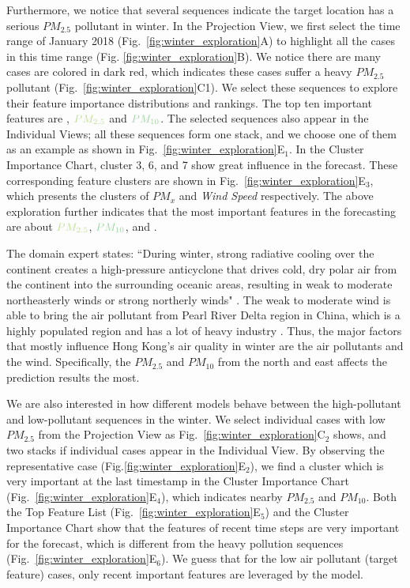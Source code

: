 Furthermore, we notice that several sequences indicate the target location has a serious $PM_{2.5}$ pollutant in winter. 
In the Projection View, we first select the time range of January 2018 (Fig.~\ref{fig:winter_exploration}A) to highlight all the cases in this time range (Fig. \ref{fig:winter_exploration}B). 
We notice there are many cases are colored in dark red, which indicates these cases suffer a heavy $PM_{2.5}$ pollutant (Fig.~\ref{fig:winter_exploration}C1).
We select these sequences to explore their feature importance distributions and rankings.
The top ten important features are \textit{\color{WINDColor}{Wind Speed}}, $\color{PM25Color}{PM_{2.5}}$ and $\color{PM10Color}{PM_{10}}$.
The selected sequences also appear in the Individual Views; all these sequences form one stack, and we choose one of them as an example as shown in Fig.~\ref{fig:winter_exploration}E$_1$. 
In the Cluster Importance Chart, cluster 3, 6, and 7 show great influence in the forecast. 
These corresponding feature clusters are shown in Fig.~\ref{fig:winter_exploration}E$_3$, which presents the clusters of $PM_x$ and \textit{Wind Speed} respectively. 
The above exploration further indicates that the most important features in the forecasting are about $\color{PM25Color}{PM_{2.5}}$, $\color{PM10Color}{PM_{10}}$, and \textit{\color{WINDColor}{Wind Speed}}. 

The domain expert states: ``During winter, strong radiative cooling over the continent creates a high-pressure anticyclone that drives cold, dry polar air from the continent into the surrounding oceanic areas, resulting in weak to moderate northeasterly winds or strong northerly winds" \cite{louie2005seasonal, murakami1979winter}. 
The weak to moderate wind is able to bring the air pollutant from Pearl River Delta region in China, which is a highly populated region and has a lot of heavy industry \cite{cao2003characteristics}.
Thus, the major factors that mostly influence Hong Kong's air quality in winter are the air pollutants and the wind.
Specifically, the $PM_{2.5}$ and $PM_{10}$ from the north and east affects the prediction results the most. 

We are also interested in how different models behave between the high-pollutant and low-pollutant sequences in the winter. 
We select individual cases with low $PM_{2.5}$ from the Projection View as Fig.~\ref{fig:winter_exploration}C$_2$ shows, and two stacks if individual cases appear in the Individual View. 
By observing the representative case (Fig.\ref{fig:winter_exploration}E$_2$), we find a cluster which is very important at the last timestamp in the Cluster Importance Chart (Fig.~\ref{fig:winter_exploration}E$_4$), which indicates nearby $PM_{2.5}$ and $PM_{10}$. 
Both the Top Feature List (Fig.~\ref{fig:winter_exploration}E$_5$) and the Cluster Importance Chart show that the features of recent time steps are very important for the forecast, which is different from the heavy pollution sequences (Fig.~\ref{fig:winter_exploration}E$_6$). 
We guess that for the low air pollutant (target feature) cases, only recent important features are leveraged by the model. 

